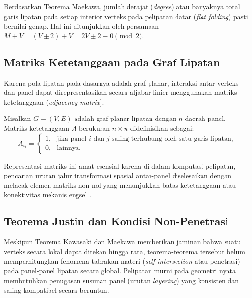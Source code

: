 \begin{akibat}
  Berdasarkan Teorema Maekawa, jumlah derajat (\textit{degree}) atau banyaknya total garis lipatan pada setiap interior verteks pada pelipatan datar (\textit{flat folding}) pasti bernilai genap. Hal ini ditunjukkan oleh persamaan $M + V = (V \pm 2) + V = 2V \pm 2 \equiv 0 \pmod 2$.
\end{akibat}

\subsection{Matriks Ketetanggaan pada Graf Lipatan}
Karena pola lipatan pada dasarnya adalah graf planar, interaksi antar verteks dan panel dapat direpresentasikan secara aljabar linier menggunakan matriks ketetanggaan (\textit{adjacency matrix}).
\begin{definisi}
  Misalkan $G = (V, E)$ adalah graf planar lipatan dengan $n$ daerah panel. Matriks ketetanggaan $A$ berukuran $n \times n$ didefinisikan sebagai:
  \[
    A_{ij} = 
    \begin{cases}
      1, & \text{jika panel } i \text{ dan } j \text{ saling terhubung oleh satu garis lipatan}, \\
      0, & \text{lainnya}.
    \end{cases}
  \]
\end{definisi}
Representasi matriks ini amat esensial karena di dalam komputasi pelipatan, pencarian urutan jalur transformasi spasial antar-panel diselesaikan dengan melacak elemen matriks non-nol yang menunjukkan batas ketetanggaan atau konektivitas mekanis engsel \parencite{ku2014realization}.

\subsection{Teorema Justin dan Kondisi Non-Penetrasi}
Meskipun Teorema Kawasaki dan Maekawa memberikan jaminan bahwa suatu verteks secara lokal dapat ditekan hingga rata, teorema-teorema tersebut belum memperhitungkan fenomena tabrakan materi (\textit{self-intersection} atau penetrasi) pada panel-panel lipatan secara global. Pelipatan murni pada geometri nyata membutuhkan penugasan susunan panel (urutan \textit{layering}) yang konsisten dan saling kompatibel secara beruntun.

